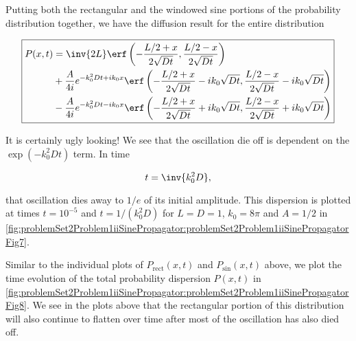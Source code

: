{

Putting both the rectangular and the windowed sine portions of the probability distribution together, we have the diffusion result for the entire distribution

\begin{equation}\label{eqn:basicStatMechProblemSet2Problem1:460}
\boxed{
\begin{aligned}
P(x, t)
&=
\inv{2 L} \erf
\left( 
-\frac{L/2 +x}{2 \sqrt{D t}} 
,
\frac{L/2 -x}{2 \sqrt{D t}} 
\right) \\
&+
\frac{A}{4 i }
e^{ -k_0^2 D t + i k_0 x }
\erf\left( 
   -\frac{L/2 +x}{2 \sqrt{D t}} - i k_0 \sqrt{D t},
   \frac{L/2 - x}{2 \sqrt{Dt}} - i k_0 \sqrt{D t} 
\right) \\
&-
\frac{A}{4 i }
e^{ -k_0^2 D t -i k_0 x }
\erf\left(
   -\frac{L/2 +x}{2 \sqrt{D t}} + i k_0 \sqrt{D t},
   \frac{L/2 - x}{2 \sqrt{Dt}} + i k_0 \sqrt{D t}
\right)
\end{aligned}
}
\end{equation}

It is certainly ugly looking!  We see that the oscillation die off is dependent on the $\exp( -k_0^2 D t)$ term.  In time

\begin{dmath}\label{eqn:basicStatMechProblemSet2Problem1:580}
t = \inv{k_0^2 D},
\end{dmath}

that oscillation dies away to $1/e$ of its initial amplitude.  This dispersion is plotted at times $t = 10^{-5}$ and $t = 1/(k_0^2 D)$ for $L = D = 1$, $k_0 = 8 \pi$ and $A = 1/2$ in \cref{fig:problemSet2Problem1iiSinePropagator:problemSet2Problem1iiSinePropagatorFig7}.


Similar to the individual plots of $P_{\mathrm{rect}}(x, t)$ and $P_{\mathrm{sin}}(x, t)$ above, we plot the time evolution of the total probability dispersion $P(x, t)$ in \cref{fig:problemSet2Problem1iiSinePropagator:problemSet2Problem1iiSinePropagatorFig8}.  We see in the plots above that the rectangular portion of this distribution will also continue to flatten over time after most of the oscillation has also died off.

}
